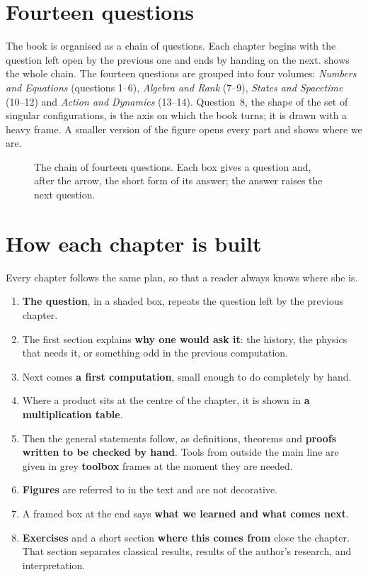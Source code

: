 \section{Fourteen questions}

The book is organised as a chain of questions. Each chapter begins with the question left open by the previous one and ends by handing on the next.  shows the whole chain. The fourteen questions are grouped into four volumes:
\emph{Numbers and Equations} (questions 1--6), \emph{Algebra and Rank} (7--9), \emph{States and Spacetime} (10--12) and \emph{Action and Dynamics} (13--14). Question~8, the shape of the set of singular configurations, is the axis on which the book turns; it is drawn with a heavy frame. A smaller version of the figure opens every part and shows where we are.

\begin{figure}[p]
  \centering\resizebox{\textwidth}{!}{}
  \caption{The chain of fourteen questions. Each box gives a question and, after the arrow, the short form of its answer; the answer raises the next question.}
  \label{fig:pro-compass}
\end{figure}

\section{How each chapter is built}

Every chapter follows the same plan, so that a reader always knows where she is.
\begin{enumerate}[itemsep=0.2ex]
\item \textbf{The question}, in a shaded box, repeats the question left by the previous chapter.
\item The first section explains \textbf{why one would ask it}: the history, the physics that needs it, or something odd in the previous computation.
\item Next comes \textbf{a first computation}, small enough to do completely by hand.
\item Where a product sits at the centre of the chapter, it is shown in \textbf{a multiplication table}.
\item Then the general statements follow, as definitions, theorems and \textbf{proofs written to be checked by hand}. Tools from outside the main line are given in grey \textbf{toolbox} frames at the moment they are needed.
\item \textbf{Figures} are referred to in the text and are not decorative.
\item A framed box at the end says \textbf{what we learned and what comes next}.
\item \textbf{Exercises} and a short section \textbf{where this comes from} close the chapter. That section separates classical results, results of the author's research, and interpretation.
\end{enumerate}

